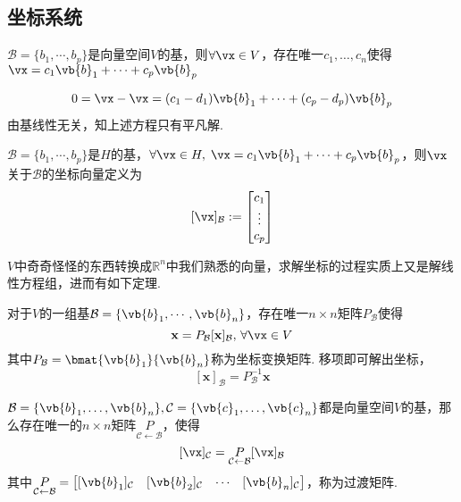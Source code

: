 \subsection{坐标系统}
\label{coordinate-system}
\begin{theorem}[向量唯一表示定理]
$\mathcal{B}=\{b_1,\cdots,b_p\}$是向量空间$V$的基，则$\forall\vx\in V$，存在唯一$c_1,\dots,c_n$使得$\vx=c_1\vb{b}_1+\cdots+c_p\vb{b}_p$
\end{theorem}
\begin{analysis}
\[0=\vx-\vx=(c_1-d_1)\vb{b}_1+\cdots+(c_p-d_p)\vb{b}_p\]
由基线性无关，知上述方程只有平凡解.
\end{analysis}
\begin{definition}[坐标向量]
$\mathcal{B}=\{b_1,\cdots,b_p\}$是$H$的基，$\forall\vx\in H,\;\vx=c_1\vb{b}_1+\cdots+c_p\vb{b}_p$，则$\vx$关于$\mathcal{B}$的坐标向量定义为
\[[\vx]_{\mathcal{B}}:=\begin{bmatrix}c_1\\ \vdots \\ c_p\end{bmatrix}\]
\end{definition}
$V$中奇奇怪怪的东西转换成$\mathbb{R}^n$中我们熟悉的向量，求解坐标的过程实质上又是解线性方程组，进而有如下定理.
\begin{theorem}[坐标变换矩阵]
对于$V$的一组基$\mathcal{B}=\{\vb{b}_1,\cdots,\vb{b}_n\}$，存在唯一$n\times n$矩阵$P_\mathcal{B}$使得
\[\mathbf{x}=P_\mathcal{B}[\mathbf{x}]_{\mathcal{B}},\,\forall \vx\in V\]
其中$P_\mathcal{B}=\bmat{\vb{b}_1}{\vb{b}_n}$称为坐标变换矩阵. 移项即可解出坐标，
\[[\mathbf{x}]_{\mathcal{B}}=P_\mathcal{B}^{-1} \mathbf{x}\]
\end{theorem}
\begin{theorem}[换基]
$\mathcal{B}=\{\vb{b}_1,\dots,\vb{b}_n\},\mathcal{C}=\{\vb{c}_1,\dots,\vb{c}_n\}$都是向量空间$V$的基，那么存在唯一的$n\times n$矩阵$\underset{\mathcal{C}\gets \mathcal{B}}{P}$，使得
\[[\vx]_{\mathcal{C}}=\underset{\mathcal{C}\gets \mathcal{B}}{P}[\vx]_{\mathcal{B}}\]
其中$\underset{\mathcal{C}\gets \mathcal{B}}{P}=\begin{bmatrix}[\vb{b}_1]_{\mathcal{C}}&[\vb{b}_2]_{\mathcal{C}}&\cdots&[\vb{b}_n]_{\mathcal{C}}\end{bmatrix}$，称为过渡矩阵.
\end{theorem}
